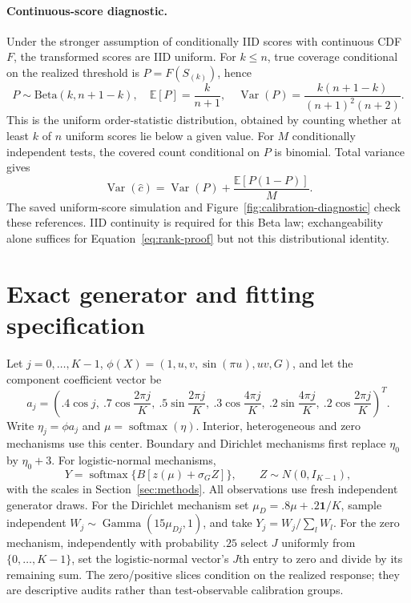 \paragraph{Continuous-score diagnostic.}
Under the stronger assumption of conditionally IID scores with continuous CDF $F$, the transformed scores are IID uniform. For $k\leq n$, true coverage conditional on the realized threshold is $P=F(S_{(k)})$, hence
\begin{equation}
 P\sim\mathrm{Beta}(k,n+1-k),\quad
 \mathbb E[P]=\frac{k}{n+1},\quad
 \operatorname{Var}(P)=\frac{k(n+1-k)}{(n+1)^2(n+2)}.
 \label{eq:beta}
\end{equation}
This is the uniform order-statistic distribution, obtained by counting whether at least $k$ of $n$ uniform scores lie below a given value. For $M$ conditionally independent tests, the covered count conditional on $P$ is binomial. Total variance gives
\begin{equation}
 \operatorname{Var}(\widehat c)=\operatorname{Var}(P)+\frac{\mathbb E[P(1-P)]}{M}.
 \label{eq:beta-binomial}
\end{equation}
The saved uniform-score simulation and Figure~\ref{fig:calibration-diagnostic} check these references. IID continuity is required for this Beta law; exchangeability alone suffices for Equation~\eqref{eq:rank-proof} but not this distributional identity.

\section{Exact generator and fitting specification}
\label{app:generators}
Let $j=0,\ldots,K-1$, $\phi(X)=(1,u,v,\sin(\pi u),uv,G)$, and let the component coefficient vector be
\begin{equation}
 a_j=\left(.4\cos j,\ .7\cos\frac{2\pi j}{K},\ .5\sin\frac{2\pi j}{K},\ .3\cos\frac{4\pi j}{K},\ .2\sin\frac{4\pi j}{K},\ .2\cos\frac{2\pi j}{K}\right)^T.
 \label{eq:generator-coef}
\end{equation}
Write $\eta_j=\phi a_j$ and $\mu=\operatorname{softmax}(\eta)$. Interior, heterogeneous and zero mechanisms use this center. Boundary and Dirichlet mechanisms first replace $\eta_0$ by $\eta_0+3$. For logistic-normal mechanisms,
\begin{equation}
 Y=\operatorname{softmax}\{B[z(\mu)+\sigma_G Z]\},\qquad Z\sim N(0,I_{K-1}),
 \label{eq:logistic-normal}
\end{equation}
with the scales in Section~\ref{sec:methods}. All observations use fresh independent generator draws. For the Dirichlet mechanism set $\mu_D=.8\mu+.2\mathbf1/K$, sample independent $W_j\sim\operatorname{Gamma}(15\mu_{Dj},1)$, and take $Y_j=W_j/\sum_lW_l$. For the zero mechanism, independently with probability $.25$ select $J$ uniformly from $\{0,\ldots,K-1\}$, set the logistic-normal vector's $J$th entry to zero and divide by its remaining sum. The zero/positive slices condition on the realized response; they are descriptive audits rather than test-observable calibration groups.

